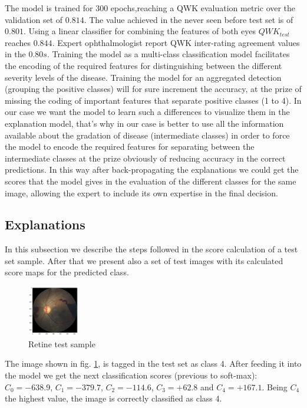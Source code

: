 \documentclass[preprint]{elsarticle}
\theoremstyle{definition} %
\theoremstyle{remark}
\begin{document}
The model is trained for 300 epochs,reaching a QWK evaluation metric over the validation set of $0.814$. The value achieved in the never seen before test set is of $0.801$. Using a linear classifier for combining the features of both eyes $QWK_{test}$ reaches $0.844$. Expert ophthalmologist report QWK inter-rating agreement values in the $0.80s$. Training the model as a multi-class classification model facilitates the encoding of the required features for distinguishing between the different severity levels of the disease. Training the model for an aggregated detection (grouping the positive classes) will for sure increment the accuracy, at the prize of missing the coding of important features that separate positive classes (1 to 4). In our case we want the model to learn such a differences to visualize them in the explanation model, that's why in our case is better to use all the information available about the gradation of disease (intermediate classes) in order to force the model to encode the required features for separating between the intermediate classes at the prize obviously of reducing accuracy in the correct predictions. In this way after back-propagating the explanations we could get the scores that the model gives in the evaluation of the different classes for the same image, allowing the expert to include its own expertise in the final decision.

\subsection{Explanations}

In this subsection we describe the steps followed in the score calculation of a test set sample. After that we present also a set of test images with its calculated score maps for the predicted class. 

\begin{figure}
	\centering
	\includegraphics[width=0.20\textwidth]{figures/score-prop-23713_left/retine.png}
	\caption{Retine test sample}
	\label{fig:retine_test1}
\end{figure}

The image shown in fig. \ref{fig:retine_test1}, is tagged in the test set as class 4. After feeding it into the model we get the next classification scores (previous to soft-max): $C_0 = -638.9$, $C_1 = -379.7$, $C_2 = -114.6$, $C_3 = +62.8$ and $C_4 = +167.1$. Being $C_4$ the highest value, the image is correctly classified as class 4. 
\end{document}

